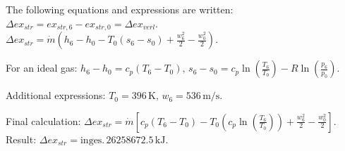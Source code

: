 The following equations and expressions are written:  
\( \Delta ex_{str} = ex_{str,6} - ex_{str,0} = \Delta ex_{verl} \).  
\( \Delta ex_{str} = \dot{m} (h_6 - h_0 - T_0 (s_6 - s_0) + \frac{w_6^2}{2} - \frac{w_0^2}{2}) \).  

For an ideal gas:  
\( h_6 - h_0 = c_p (T_6 - T_0), \, s_6 - s_0 = c_p \ln \left(\frac{T_6}{T_0}\right) - R \ln \left(\frac{p_6}{p_0}\right) \).  

Additional expressions:  
\( T_0 = 396 \, \text{K}, \, w_6 = 536 \, \text{m/s} \).  

Final calculation:  
\( \Delta ex_{str} = \dot{m} \left[ c_p (T_6 - T_0) - T_0 \left(c_p \ln \left(\frac{T_6}{T_0}\right)\right) + \frac{w_6^2}{2} - \frac{w_0^2}{2} \right] \).  
Result: \( \Delta ex_{str} = \text{inges.} \, 26258672.5 \, \text{kJ} \).